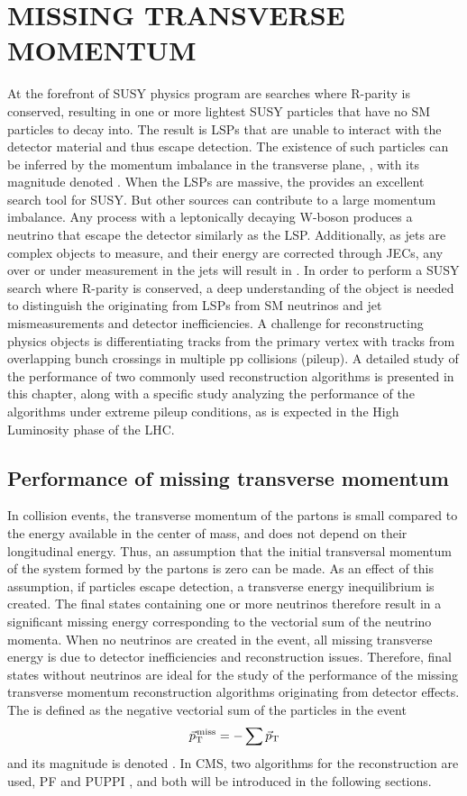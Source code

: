 \part{MISSING TRANSVERSE MOMENTUM}
\noindent
\justify
At the forefront of SUSY physics program are searches where R-parity is conserved, resulting in one or more lightest SUSY particles that have no SM particles to decay into. 
The result is LSPs that are unable to interact with the detector material and thus escape detection.
The existence of such particles can be inferred by the momentum imbalance in the transverse plane, \ptvecmiss, with its magnitude denoted \ptmiss. 
When the LSPs are massive, the \ptmiss provides an excellent search tool for SUSY. But other sources can contribute to a large momentum imbalance. 
Any process with a leptonically decaying W-boson produces a neutrino that escape the detector similarly as the LSP. 
Additionally, as jets are complex objects to measure, and their energy are corrected through JECs, any over or under measurement in the jets will result in \ptmiss. 
In order to perform a SUSY search where R-parity is conserved, a deep understanding of the \ptmiss object is needed to distinguish the \ptmiss originating from LSPs from SM neutrinos and jet mismeasurements and detector inefficiencies. 
A challenge for reconstructing physics objects is differentiating tracks from the primary vertex with tracks from overlapping bunch crossings in multiple pp collisions (pileup). 
A detailed study of the performance of two commonly used \ptmiss reconstruction algorithms is presented in this chapter, along with a specific study analyzing the performance of the algorithms under extreme pileup conditions, as is expected in the High Luminosity phase of the LHC.    
\chapter{Performance of missing transverse momentum}\label{sec:met}
\noindent
\justify
In collision events, the transverse momentum of the partons is small compared to the energy available in the center of mass, and does not depend on their longitudinal energy. 
Thus, an assumption that the initial transversal momentum of the system formed by the partons is zero can be made. 
As an effect of this assumption, if particles escape detection, a transverse energy inequilibrium is created. 
The final states containing one or more neutrinos therefore result in a significant missing energy corresponding to the vectorial sum of the neutrino momenta. 
When no neutrinos are created in the event, all missing transverse energy is due to detector inefficiencies and reconstruction issues. 
Therefore, final states without neutrinos are ideal for the study of the performance of the missing transverse momentum reconstruction algorithms originating from detector effects.
The \ptmiss is defined as the negative vectorial sum of the particles in the event
\begin{equation}
{\vec p}_{\mathrm{T}}^{\kern1pt\text{miss}} =- \sum \vec{p}_{\mathrm{T}}
\end{equation}                                                                      
and its magnitude is denoted \ptmiss. 
In CMS, two algorithms for the \ptmiss reconstruction are used, PF \ptmiss and PUPPI \ptmiss, and both will be introduced in the following sections. 
